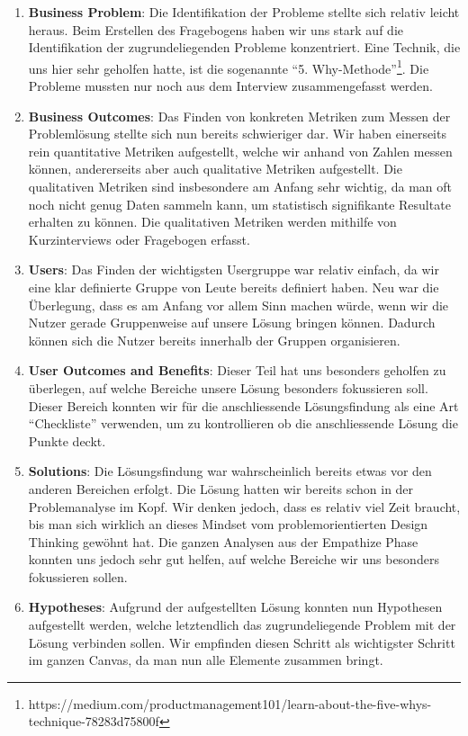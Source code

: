 \begin{enumerate}
    \item \textbf{Business Problem}: Die Identifikation der Probleme stellte sich relativ leicht heraus. Beim Erstellen des Fragebogens haben wir uns stark auf die Identifikation der zugrundeliegenden Probleme konzentriert. Eine Technik, die uns hier sehr geholfen hatte, ist die sogenannte ``5. Why-Methode''\footnote{https://medium.com/productmanagement101/learn-about-the-five-whys-technique-78283d75800f}. Die Probleme mussten nur noch aus dem Interview zusammengefasst werden.
    \item \textbf{Business Outcomes}: Das Finden von konkreten Metriken zum Messen der Problemlösung stellte sich nun bereits schwieriger dar. Wir haben einerseits rein quantitative Metriken aufgestellt, welche wir anhand von Zahlen messen können, andererseits aber auch qualitative Metriken aufgestellt. Die qualitativen Metriken sind insbesondere am Anfang sehr wichtig, da man oft noch nicht genug Daten sammeln kann, um statistisch signifikante Resultate erhalten zu können. Die qualitativen Metriken werden mithilfe von Kurzinterviews oder Fragebogen erfasst. \citep{croll2013lean}
    \item \textbf{Users}: Das Finden der wichtigsten Usergruppe war relativ einfach, da wir eine klar definierte Gruppe von Leute bereits definiert haben. Neu war die Überlegung, dass es am Anfang vor allem Sinn machen würde, wenn wir die Nutzer gerade Gruppenweise auf unsere Lösung bringen können. Dadurch können sich die Nutzer bereits innerhalb der Gruppen organisieren.
    \item \textbf{User Outcomes and Benefits}: Dieser Teil hat uns besonders geholfen zu überlegen, auf welche Bereiche unsere Lösung besonders fokussieren soll. Dieser Bereich konnten wir für die anschliessende Lösungsfindung als eine Art ``Checkliste'' verwenden, um zu kontrollieren ob die anschliessende Lösung die Punkte deckt.
    \item \textbf{Solutions}: Die Lösungsfindung war wahrscheinlich bereits etwas vor den anderen Bereichen erfolgt. Die Lösung hatten wir bereits schon in der Problemanalyse im Kopf. Wir denken jedoch, dass es relativ viel Zeit braucht, bis man sich wirklich an dieses Mindset vom problemorientierten Design Thinking gewöhnt hat. Die ganzen Analysen aus der Empathize Phase konnten uns jedoch sehr gut helfen, auf welche Bereiche wir uns besonders fokussieren sollen.
    \item \textbf{Hypotheses}: Aufgrund der aufgestellten Lösung konnten nun Hypothesen aufgestellt werden, welche letztendlich das zugrundeliegende Problem mit der Lösung verbinden sollen. Wir empfinden diesen Schritt als wichtigster Schritt im ganzen Canvas, da man nun alle Elemente zusammen bringt.

\end{enumerate}
